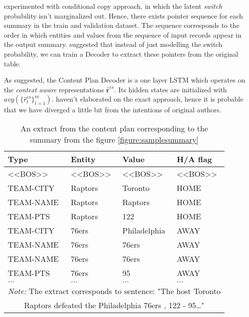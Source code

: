 \citet{wiseman2017} experimented with conditional copy approach, in which the latent \emph{switch} probability isn't marginalized out. Hence, there exists pointer sequence for each summary in the train and validation dataset. The sequence corresponds to the order in which entities and values from the sequence of input records appear in the output summary. \citet{puduppully2019datatotext} suggested that instead of just modelling the switch probability, we can train a Decoder to extract these pointers from the original table.

As suggested, the Content Plan Decoder is a one layer LSTM which operates on the \emph{context aware} representations $\hat{\boldsymbol{r}}^{cs}$. Its hidden states are initialized with $avg(\{\hat{r}_t^{cs}\}_{t=1}^m)$. \citep{puduppully2019datatotext} haven't elaborated on the exact approach, hence it is probable that we have diverged a little bit from the intentions of original authors.

\begin{table}[h]
    \centering \small
    \begin{tabular}{llll}
        \toprule
        \textbf{Type} & \textbf{Entity} & \textbf{Value} & \textbf{H/A flag} \\                  
        \midrule
        \textless{}\textless{}BOS\textgreater{}\textgreater{} & \textless{}\textless{}BOS\textgreater{}\textgreater{} & \textless{}\textless{}BOS\textgreater{}\textgreater{} & \textless{}\textless{}BOS\textgreater{}\textgreater{} \\
        TEAM-CITY    & Raptors      & Toronto      & HOME                                                  \\
        TEAM-NAME    & Raptors      & Raptors      & HOME                                                  \\
        TEAM-PTS     & Raptors      & 122          & HOME                                                  \\
        TEAM-CITY    & 76ers        & Philadelphia & AWAY                                                  \\
        TEAM-NAME    & 76ers        & 76ers        & AWAY                                                  \\
        TEAM-NAME    & 76ers        & 76ers        & AWAY                                                  \\
        TEAM-PTS     & 76ers        & 95           & AWAY                                                  \\
        $\dots$      & $\dots$      & $\dots$      & $\dots$ \\                                        
        \bottomrule
        \multicolumn{4}{c}{\footnotesize \textit{Note:} The extract corresponds to sentence: "The host Toronto} \\
        \multicolumn{4}{c}{\footnotesize Raptors defeated the Philadelphia 76ers , 122 - 95\dots "}
    \end{tabular}
    \caption{An extract from the content plan corresponding to the summary from the figure \ref{figure:samplesummary}}
\end{table}

